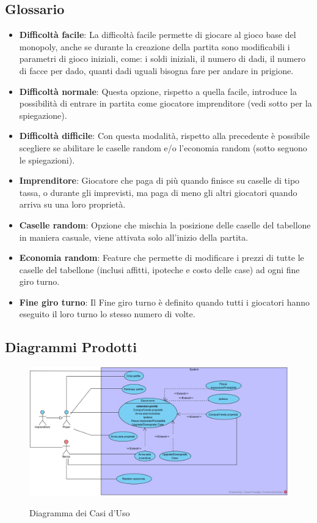 \documentclass{article}
\begin{document}
\subsection{Glossario}
\begin{itemize}
  \item \textbf{Difficoltà facile}: La difficoltà facile permette di giocare al gioco base del monopoly, anche se durante la creazione della partita sono modificabili i parametri di gioco iniziali, come: i soldi iniziali, il numero di dadi, il numero di facce per dado, quanti dadi uguali bisogna fare per andare in prigione.
  \item \textbf{Difficoltà normale}:  Questa opzione, rispetto a quella facile, introduce la possibilità di entrare in partita come giocatore imprenditore (vedi sotto per la spiegazione).
  \item \textbf{Difficoltà difficile}:  Con questa modalità, rispetto alla precedente è possibile scegliere se abilitare le caselle random e/o l'economia random (sotto seguono le spiegazioni).
  
  \item \textbf{Imprenditore}: Giocatore che paga di più quando finisce su caselle di tipo tassa, o durante gli imprevisti, ma paga di meno gli altri giocatori quando arriva su una loro proprietà.
  \item \textbf{Caselle random}: Opzione che mischia la posizione delle caselle del tabellone in maniera casuale, viene attivata solo all'inizio della partita.
  \item \textbf{Economia random}: Feature che permette di modificare i prezzi di tutte le caselle del tabellone (inclusi affitti, ipoteche e costo delle case) ad ogni fine giro turno.
  \item \textbf{Fine giro turno}: Il Fine giro turno è definito quando tutti i giocatori hanno eseguito il loro turno lo stesso numero di volte.
   
 \end{itemize}

\subsection{Diagrammi Prodotti}

	\begin{figure}[H]
	\centering
\href{https://github.com/UnimibSoftEngCourse2022/progetto-monopoly-1-gangoffour2/blob/feat/doc/doc/img/ModelloCasiDUso.jpg?raw=true}
	{\includegraphics[width=\textwidth]{ModelloCasiDUso}}
	\caption{Diagramma dei Casi d'Uso}
	\end{figure}
	
\end{document}
